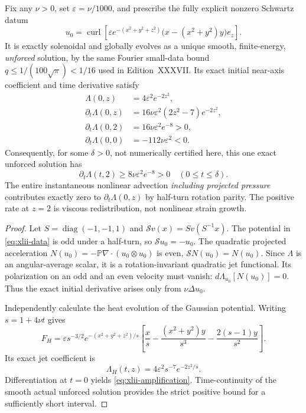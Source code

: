 \begin{theorem}
\label{thm:xlii-positive}
Fix any $\nu>0$, set $\varepsilon=\nu/1000$, and prescribe
the fully explicit nonzero Schwartz datum
\begin{equation}\label{eq:xlii-data}
\boxed{\quad u_0=\operatorname{curl}\left[
\varepsilon e^{-(x^2+y^2+z^2)}
\bigl(x-(x^2+y^2)y\bigr)e_z\right].\quad}
\end{equation}
It is exactly solenoidal and globally evolves as a unique
smooth, finite-energy, \emph{unforced} solution, by the
same Fourier small-data bound $q\le1/(100\sqrt\pi)<1/16$
used in Edition~XXXVII. Its exact initial near-axis
coefficient and time derivative satisfy
\begin{equation}\label{eq:xlii-amplification}
\boxed{\begin{aligned}
\Lambda(0,z)&=4\varepsilon^2e^{-2z^2},\\
\partial_t\Lambda(0,z)&=
16\nu\varepsilon^2(2z^2-7)e^{-2z^2},\\
\partial_t\Lambda(0,2)&=16\nu\varepsilon^2e^{-8}>0,\\
\partial_t\Lambda(0,0)&=-112\nu\varepsilon^2<0.
\end{aligned}}
\end{equation}
Consequently, for some $\delta>0$, not numerically
certified here, this one exact unforced solution has
\[
\boxed{\quad\partial_t\Lambda(t,2)
\ge 8\nu\varepsilon^2e^{-8}>0
\quad(0\le t\le\delta).\quad}
\]
The entire instantaneous nonlinear advection
\emph{including projected pressure} contributes
exactly zero to $\partial_t\Lambda(0,z)$ by
half-turn rotation parity. The positive rate at $z=2$
is viscous redistribution, not nonlinear strain growth.
\end{theorem}
\begin{proof}
Let $S=\operatorname{diag}(-1,-1,1)$ and
$\mathcal S v(x)=Sv(S^{-1}x)$.
The potential in \eqref{eq:xlii-data} is odd under
a half-turn, so $\mathscr S u_0=-u_0$.
The quadratic projected acceleration
$N(u_0)=-\mathbb P\nabla\cdot(u_0\otimes u_0)$
is even, $\mathscr S N(u_0)=N(u_0)$.
Since $\Lambda$ is an angular-average scalar,
it is a rotation-invariant quadratic jet functional.
Its polarization on an odd and an even velocity
must vanish: $d\Lambda_{u_0}[N(u_0)]=0$.
Thus the exact initial derivative arises only
from $\nu\Delta u_0$.

Independently calculate the heat evolution of the
Gaussian potential. Writing $s=1+4\nu t$ gives
\[
F_H=\varepsilon s^{-3/2}e^{-(x^2+y^2+z^2)/s}
\left[\frac{x}{s}-\frac{(x^2+y^2)y}{s^3}
-\frac{2(s-1)y}{s^2}\right].
\]
Its exact jet coefficient is
\[
\boxed{\quad\Lambda_H(t,z)=
4\varepsilon^2s^{-7}e^{-2z^2/s}.\quad}
\]
Differentiation at $t=0$ yields
\eqref{eq:xlii-amplification}. Time-continuity of
the smooth actual unforced solution provides
the strict positive bound for a sufficiently short interval.
\end{proof}

